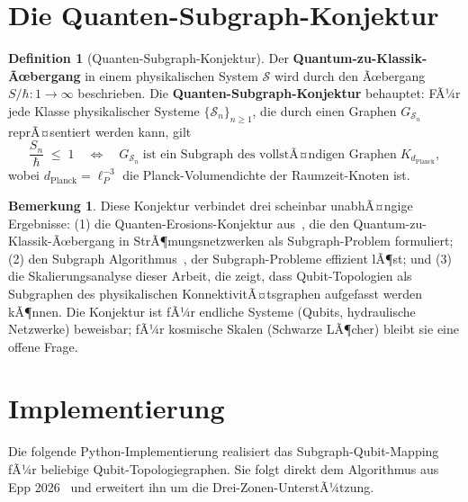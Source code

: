 ﻿\documentclass[a4paper,12pt]{article}
\theoremstyle{definition}
\newtheorem{definition}{Definition}
\newtheorem{bemerkung}{Bemerkung}
\begin{document}
\section{Die Quanten-Subgraph-Konjektur}
\label{sec:konjektur}

\begin{definition}[Quanten-Subgraph-Konjektur]
\label{def:konjektur}
Der \textbf{Quantum-zu-Klassik-Ãœbergang} in einem physikalischen System $\mathcal{S}$
wird durch den Ãœbergang $S/\hbar: 1 \to \infty$ beschrieben. Die
\textbf{Quanten-Subgraph-Konjektur} behauptet: FÃ¼r jede Klasse physikalischer
Systeme $\{\mathcal{S}_n\}_{n\geq 1}$, die durch einen Graphen $G_{\mathcal{S}_n}$
reprÃ¤sentiert werden kann, gilt
\[
  \frac{S_n}{\hbar} \;\leq\; 1
  \quad\Longleftrightarrow\quad
  G_{\mathcal{S}_n} \;\text{ist ein Subgraph des vollstÃ¤ndigen Graphen}\;
  K_{d_\mathrm{Planck}},
\]
wobei $d_\mathrm{Planck} = \ell_P^{-3}$ die Planck-Volumendichte der Raumzeit-Knoten ist.
\end{definition}

\begin{bemerkung}
Diese Konjektur verbindet drei scheinbar unabhÃ¤ngige Ergebnisse:
(1) die Quanten-Erosions-Konjektur aus~\cite{epp2026cnyn}, die den
Quantum-zu-Klassik-Ãœbergang in StrÃ¶mungsnetzwerken als Subgraph-Problem formuliert;
(2) den Subgraph Algorithmus~\cite{epp2026subgraph}, der Subgraph-Probleme effizient
lÃ¶st; und (3) die Skalierungsanalyse dieser Arbeit, die zeigt, dass
Qubit-Topologien als Subgraphen des physikalischen KonnektivitÃ¤tsgraphen aufgefasst
werden kÃ¶nnen. Die Konjektur ist fÃ¼r endliche Systeme (Qubits, hydraulische Netzwerke)
beweisbar; fÃ¼r kosmische Skalen (Schwarze LÃ¶cher) bleibt sie eine offene Frage.
\end{bemerkung}

\section{Implementierung}
\label{sec:implementierung}

Die folgende Python-Implementierung realisiert das Subgraph-Qubit-Mapping fÃ¼r
beliebige Qubit-Topologiegraphen. Sie folgt direkt dem Algorithmus aus
Epp 2026~\cite{epp2026subgraph} und erweitert ihn um die Drei-Zonen-UnterstÃ¼tzung.
\end{document}
